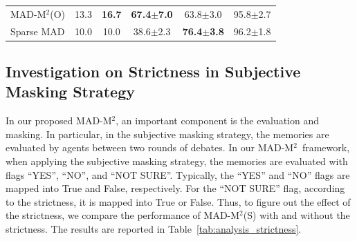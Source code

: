 \documentclass{article} %
\newcommand{\methodname}{MAD-M$^2$}
\theoremstyle{plain}
\begin{document}
\begin{table}[t]
\begin{center}
\begin{small}
\begin{threeparttable}
\begin{tabular}{lccccc}
                    \methodname (O) & 13.3 & \textbf{16.7} & \textbf{67.4$\pm$7.0} & 63.8$\pm$3.0 & 95.8$\pm$2.7\\
                    Sparse MAD & 10.0 & 10.0 & 38.6$\pm$2.3 & \textbf{76.4$\pm$3.8} & 96.2$\pm$1.8\\
                    \midrule
                    \bottomrule
				\end{tabular}
			\end{threeparttable}
		\end{small}
	\end{center}
	\vskip -0.25in
\end{table}

\vspace{-6pt}
\subsection{Investigation on Strictness in Subjective Masking Strategy}\label{appendix:strictness_analysis}
\vspace{-4pt}
In our proposed \methodname, an important component is the evaluation and masking. In particular, in the subjective masking strategy, the memories are evaluated by agents between two rounds of debates. 
In our \methodname\ framework, when applying the subjective masking strategy, the memories are evaluated with flags ``YES'', ``NO'', and ``NOT SURE''. Typically, the ``YES'' and ``NO'' flags are mapped into True and False, respectively. For the ``NOT SURE'' flag, according to the strictness, it is mapped into True or False. Thus, to figure out the effect of the strictness, we compare the performance of \methodname (S) with and without the strictness. The results are reported in Table~\ref{tab:analysis_strictness}. 
\end{document}

